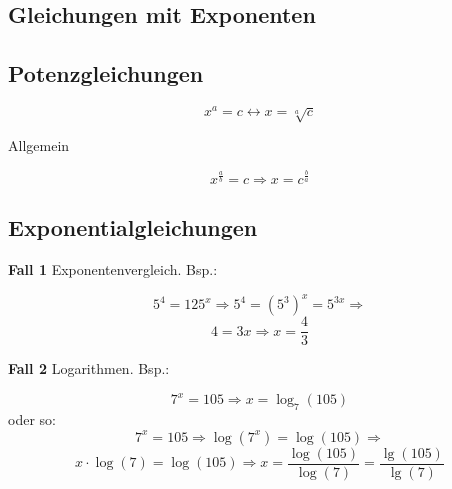 \begin{multicols}{2}


\section{Gleichungen mit Exponenten}
\subsection{Potenzgleichungen}

$$x^a=c \leftrightarrow x=\sqrt[a]{c}$$

Allgemein

$$x^{\frac{a}b} = c \Longrightarrow{}  x=c^{\frac{b}a}$$

\subsection{Exponentialgleichungen}
\textbf{Fall 1} Exponentenvergleich. Bsp.:

$$5^4=125^x \Rightarrow{} 5^4=(5^3)^x=5^{3x} \Rightarrow{}$$
$$ 4=3x \Rightarrow x=\frac43$$

\textbf{Fall 2} Logarithmen. Bsp.:

$$7^x=105 \Rightarrow x=\log_7(105)$$
oder so:
$$7^x=105 \Rightarrow \log(7^x)=\log(105) \Rightarrow$$
$$x\cdot{}\log(7)=\log(105) \Rightarrow x=\frac{\log(105)}{\log(7)} = \frac{\lg(105)}{\lg(7)}$$








\end{multicols}


